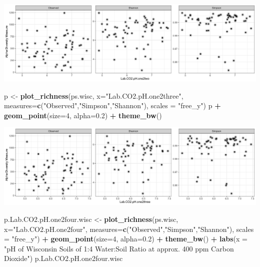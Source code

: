 \documentclass[]{article}
\newenvironment{Shaded}{\begin{snugshade}}{\end{snugshade}}
\newcommand{\DataTypeTok}[1]{\textcolor[rgb]{0.13,0.29,0.53}{#1}}
\newcommand{\DecValTok}[1]{\textcolor[rgb]{0.00,0.00,0.81}{#1}}
\newcommand{\FloatTok}[1]{\textcolor[rgb]{0.00,0.00,0.81}{#1}}
\newcommand{\KeywordTok}[1]{\textcolor[rgb]{0.13,0.29,0.53}{\textbf{#1}}}
\newcommand{\NormalTok}[1]{#1}
\newcommand{\OperatorTok}[1]{\textcolor[rgb]{0.81,0.36,0.00}{\textbf{#1}}}
\newcommand{\StringTok}[1]{\textcolor[rgb]{0.31,0.60,0.02}{#1}}
\begin{document}
\includegraphics{output-rmd/richness-ph-Lab.CO2.pH.one2two.wisc-1.png}

\begin{Shaded}
\begin{Highlighting}[]
\NormalTok{p <-}\StringTok{ }\KeywordTok{plot_richness}\NormalTok{(ps.wisc, }\DataTypeTok{x=}\StringTok{"Lab.CO2.pH.one2three"}\NormalTok{, }\DataTypeTok{measures=}\KeywordTok{c}\NormalTok{(}\StringTok{"Observed"}\NormalTok{,}\StringTok{"Simpson"}\NormalTok{,}\StringTok{"Shannon"}\NormalTok{), }\DataTypeTok{scales =} \StringTok{"free_y"}\NormalTok{)}
\NormalTok{p }\OperatorTok{+}\StringTok{ }\KeywordTok{geom_point}\NormalTok{(}\DataTypeTok{size=}\DecValTok{4}\NormalTok{, }\DataTypeTok{alpha=}\FloatTok{0.2}\NormalTok{) }\OperatorTok{+}\StringTok{ }\KeywordTok{theme_bw}\NormalTok{()}
\end{Highlighting}
\end{Shaded}

\includegraphics{output-rmd/richness-ph-Lab.CO2.pH.one2three.wisc-1.png}

\begin{Shaded}
\begin{Highlighting}[]
\NormalTok{p.Lab.CO2.pH.one2four.wisc <-}\StringTok{ }\KeywordTok{plot_richness}\NormalTok{(ps.wisc, }\DataTypeTok{x=}\StringTok{"Lab.CO2.pH.one2four"}\NormalTok{, }\DataTypeTok{measures=}\KeywordTok{c}\NormalTok{(}\StringTok{"Observed"}\NormalTok{,}\StringTok{"Simpson"}\NormalTok{,}\StringTok{"Shannon"}\NormalTok{), }\DataTypeTok{scales =} \StringTok{"free_y"}\NormalTok{) }\OperatorTok{+}\StringTok{ }\KeywordTok{geom_point}\NormalTok{(}\DataTypeTok{size=}\DecValTok{4}\NormalTok{, }\DataTypeTok{alpha=}\FloatTok{0.2}\NormalTok{) }\OperatorTok{+}\StringTok{ }\KeywordTok{theme_bw}\NormalTok{()  }\OperatorTok{+}\StringTok{ }\KeywordTok{labs}\NormalTok{(}\DataTypeTok{x =} \StringTok{"pH of Wisconsin Soils of 1:4 Water:Soil Ratio at approx. 400 ppm Carbon Dioxide"}\NormalTok{)}
\NormalTok{p.Lab.CO2.pH.one2four.wisc}
\end{Highlighting}
\end{Shaded}
\end{document}

